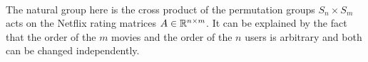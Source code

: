 \documentclass[english]{article}
\begin{document}




\section{~}

\subsection{~}

The natural group here is the cross product of the permutation groups
$S_n\times S_{m}$ acts on the Netflix rating matrices $A\in\mathbb{R}^{n\times m}$.
It can be explained by the fact that the order of the $m$ movies
and the order of the $n$ users is arbitrary and both can be changed
independently.
\end{document}
